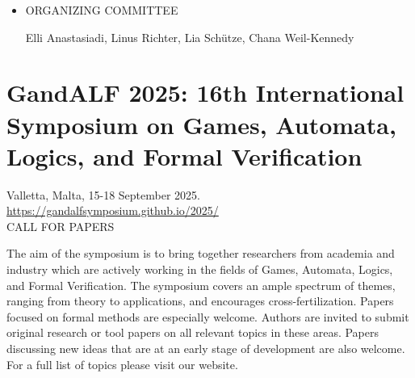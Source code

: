 \documentclass[prodmode,acmtecs]{acmsmall} %
\begin{document}
\begin{itemize}
\item  ORGANIZING COMMITTEE 
 
  Elli Anastasiadi, Linus Richter, Lia Schütze, Chana Weil-Kennedy 
 
\end{itemize}\section{GandALF 2025: 16th International Symposium on Games, Automata, Logics, and Formal Verification}\label{GandALF2025}  Valletta, Malta, 15-18 September 2025.\\ 
  \href{https://gandalfsymposium.github.io/2025/}{https://gandalfsymposium.github.io/2025/}\\ 
CALL FOR PAPERS 

  The aim of the symposium is to bring together researchers from academia and industry which are actively working in the fields of Games, Automata, Logics, and Formal Verification. The symposium covers an ample spectrum of themes, ranging from theory to applications, and encourages cross-fertilization. Papers focused on formal methods are especially welcome. Authors are invited to submit original research or tool papers on all relevant topics in these areas. Papers discussing new ideas that are at an early stage of development are also welcome.\\ 
  For a full list of topics please visit our website.\\ 
\end{document}
